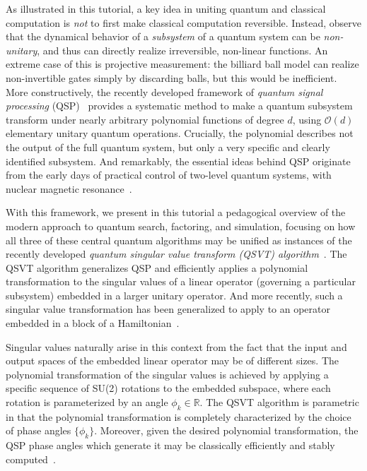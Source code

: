\documentclass[aps,pra,showpacs,notitlepage,twocolumn,superscriptaddress,nofootinbib]{revtex4-1}
\begin{document}
    As illustrated in this tutorial, a key idea in uniting quantum and classical computation is {\em not} to first make classical computation reversible.  Instead, observe that the dynamical behavior of a {\em subsystem} of a quantum system can be {\em non-unitary}, and thus can directly realize irreversible, non-linear functions.  An extreme case of this is projective measurement: the billiard ball model can realize non-invertible gates simply by discarding balls, but this would be inefficient.  More constructively, the recently developed framework of {\em quantum signal processing} (QSP)~\cite{Low_2016,Low_2019} provides a systematic method to make a quantum subsystem transform under nearly arbitrary polynomial functions of degree $d$, using $\mathcal{O}(d)$ elementary unitary quantum operations.  Crucially, the polynomial describes not the output of the full quantum system, but only a very specific and clearly identified subsystem.  And remarkably, the essential ideas behind QSP originate from the early days of practical control of two-level quantum systems, with nuclear magnetic resonance~\cite{freeman1998spin,levitt1986composite,wimperis1994broadband}.
    
    With this framework, we present in this tutorial a pedagogical overview of the modern approach to quantum search, factoring, and simulation, focusing on how all three of these central quantum algorithms may be unified as instances of the recently developed {\em quantum singular value transform (QSVT) algorithm}~\cite{Gily_n_2019}. The QSVT algorithm generalizes QSP and efficiently applies a polynomial transformation to the singular values of a linear operator (governing a particular subsystem) embedded in a larger unitary operator. And more recently, such a singular value transformation has been generalized to apply to an operator embedded in a block of a Hamiltonian~\cite{lloyd2021hamiltonian}.
    
    Singular values naturally arise in this context from the fact that the input and output spaces of the embedded linear operator may be of different sizes.
    The polynomial transformation of the singular values is achieved by applying a specific sequence of SU(2) rotations to the embedded subspace, where each rotation is parameterized by an angle $\phi_k \in \mathbb{R}$. The QSVT algorithm is parametric in that the polynomial transformation is completely characterized by the choice of phase angles $\{\phi_k\}$. Moreover, given the desired polynomial transformation, the QSP phase angles which generate it may be classically efficiently and stably computed~\cite{Low_2016, Gily_n_2019, efficient_qsp_phase_factors}.  
        
\end{document}
